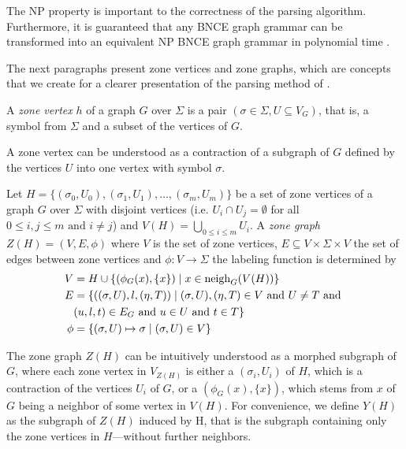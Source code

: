 The NP property is important to the correctness of the parsing algorithm. Furthermore, it is guaranteed that any BNCE graph grammar can be transformed into an equivalent NP BNCE graph grammar in polynomial time \cite{rozenberg1986boundary, skodinis1998neighborhood}.

The next paragraphs present zone vertices and zone graphs, which are concepts that we create for a clearer presentation of the parsing method of \citep{rozenberg1986boundary}.

\begin{definition}
	\label{def:zv}
	A \emph{zone vertex} $h$ of a graph $G$ over $\Sigma$ is a pair $(\sigma \in \Sigma, U \subseteq V_G)$, that is, a symbol from $\Sigma$ and a subset of the vertices of $G$.
\end{definition}

A zone vertex can be understood as a contraction of a subgraph of $G$ defined by the vertices $U$ into one vertex with symbol $\sigma$.

\begin{definition}
	\label{def:z}
	Let $H = \{(\sigma_0,U_0),(\sigma_1,U_1),\dots,(\sigma_m,U_m)\}$ be a set of zone vertices of a graph $G$ over $\Sigma$ with disjoint vertices (i.e. $U_i \cap U_j = \emptyset$ for all $0 \leq i,j \leq m \text{ and } i \neq j$) and $V(H) = \bigcup_{0 \leq i \leq m}{U_i}$. A \emph{zone graph} $Z(H) = (V, E, \phi)$ where $V$ is the set of zone vertices, $E \subseteq V \times \Sigma \times V$ the set of edges between zone vertices and $\phi: V \to \Sigma$ the labeling function is determined by
	\begin{align*}
		V & = H \cup \{(\phi_G(x),\{x\}) \; | \; x \in \operatorname{neigh}_{G}(V(H)) \}\\
		E & = \{((\sigma,U),l,(\eta,T)) \; | \; (\sigma,U),(\eta,T) \in V \text{ and } U \neq T \text{ and } \\
		& (u,l,t) \in E_G \text{ and } u \in U \text{ and } t \in T\} \\
		\phi & = \{(\sigma,U) \mapsto \sigma  \; | \; (\sigma,U) \in V\}
	\end{align*}
\end{definition}

The zone graph $Z(H)$ can be intuitively understood as a morphed subgraph of $G$, where each zone vertex in $V_{Z(H)}$ is either a $(\sigma_i,U_i)$ of $H$, which is a contraction of the vertices $U_i$ of $G$, or a $(\phi_G(x),\{x\})$, which stems from $x$ of $G$ being a neighbor of some vertex in $V(H)$. For convenience, we define $Y(H)$ as the subgraph of $Z(H)$ induced by H, that is the subgraph containing only the zone vertices in $H$---without further neighbors.

